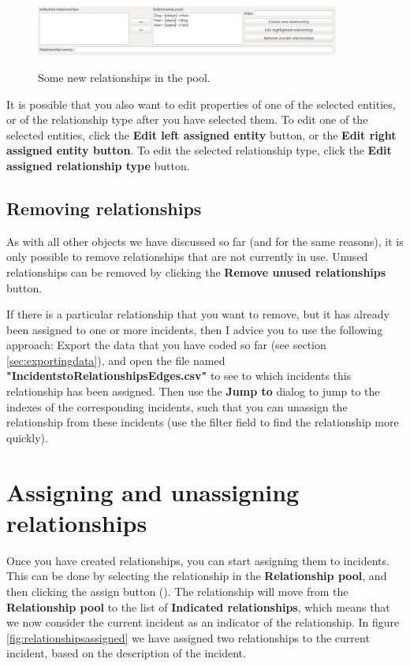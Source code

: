\documentclass{memoir}
\begin{document}
\begin{figure}[h!]
  \centering
  \caption{Some new relationships in the pool.}
  \includegraphics[width=100mm]{Screenshot_21.pdf}
  \label{fig:relationshippool}
\end{figure}

It is possible that you also want to edit properties of one of the selected entities, or of the relationship type after you have selected them. To edit one of the selected entities, click the \textbf{Edit left assigned entity} button, or the \textbf{Edit right assigned entity button}. To edit the selected relationship type, click the \textbf{Edit assigned relationship type} button.

\subsection{Removing relationships}
\label{sec:removingrelationships}

As with all other objects we have discussed so far (and for the same reasons), it is only possible to remove relationships that are not currently in use. Unused relationships can be removed by clicking the \textbf{Remove unused relationships} button.

If there is a particular relationship that you want to remove, but it has already been assigned to one or more incidents, then I advice you to use the following approach: Export the data that you have coded so far (see section \ref{sec:exportingdata}), and open the file named \textbf{"Incidents\textunderscore to\textunderscore Relationships\textunderscore Edges.csv"} to see to which incidents this relationship has been assigned. Then use the \textbf{Jump to} dialog to jump to the indexes of the corresponding incidents, such that you can unassign the relationship from these incidents (use the filter field to find the relationship more quickly).

\section{Assigning and unassigning relationships}
\label{sec:assigningunassigningrelationships}

Once you have created relationships, you can start assigning them to incidents. This can be done by selecting the relationship in the \textbf{Relationship pool}, and then clicking the assign button (\textbf{\guillemotleft}). The relationship will move from the \textbf{Relationship pool} to the list of \textbf{Indicated relationships}, which means that we now consider the current incident as an indicator of the relationship. In figure \ref{fig:relationshipsassigned} we have assigned two relationships to the current incident, based on the description of the incident.
\end{document}
